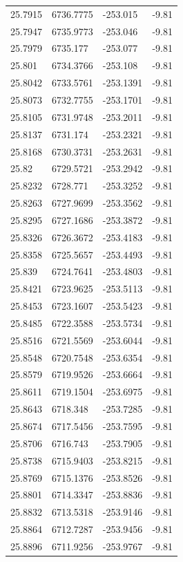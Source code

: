 \begin{table}[H]
\begin{tabular}{llll}
25.7915 & 6736.7775 & -253.015 & -9.81 \\
25.7947 & 6735.9773 & -253.046 & -9.81 \\
25.7979 & 6735.177 & -253.077 & -9.81 \\
25.801 & 6734.3766 & -253.108 & -9.81 \\
25.8042 & 6733.5761 & -253.1391 & -9.81 \\
25.8073 & 6732.7755 & -253.1701 & -9.81 \\
25.8105 & 6731.9748 & -253.2011 & -9.81 \\
25.8137 & 6731.174 & -253.2321 & -9.81 \\
25.8168 & 6730.3731 & -253.2631 & -9.81 \\
25.82 & 6729.5721 & -253.2942 & -9.81 \\
25.8232 & 6728.771 & -253.3252 & -9.81 \\
25.8263 & 6727.9699 & -253.3562 & -9.81 \\
25.8295 & 6727.1686 & -253.3872 & -9.81 \\
25.8326 & 6726.3672 & -253.4183 & -9.81 \\
25.8358 & 6725.5657 & -253.4493 & -9.81 \\
25.839 & 6724.7641 & -253.4803 & -9.81 \\
25.8421 & 6723.9625 & -253.5113 & -9.81 \\
25.8453 & 6723.1607 & -253.5423 & -9.81 \\
25.8485 & 6722.3588 & -253.5734 & -9.81 \\
25.8516 & 6721.5569 & -253.6044 & -9.81 \\
25.8548 & 6720.7548 & -253.6354 & -9.81 \\
25.8579 & 6719.9526 & -253.6664 & -9.81 \\
25.8611 & 6719.1504 & -253.6975 & -9.81 \\
25.8643 & 6718.348 & -253.7285 & -9.81 \\
25.8674 & 6717.5456 & -253.7595 & -9.81 \\
25.8706 & 6716.743 & -253.7905 & -9.81 \\
25.8738 & 6715.9403 & -253.8215 & -9.81 \\
25.8769 & 6715.1376 & -253.8526 & -9.81 \\
25.8801 & 6714.3347 & -253.8836 & -9.81 \\
25.8832 & 6713.5318 & -253.9146 & -9.81 \\
25.8864 & 6712.7287 & -253.9456 & -9.81 \\
25.8896 & 6711.9256 & -253.9767 & -9.81 \\

\end{tabular}
\end{table}
